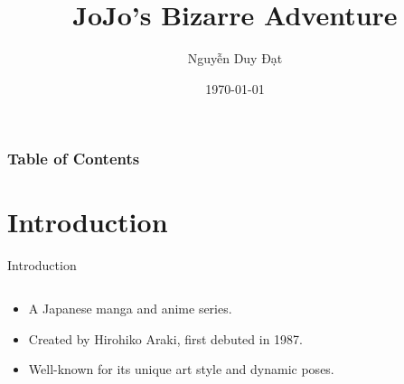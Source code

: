\documentclass[presentation]{beamer}
\title{JoJo's Bizarre Adventure}
\author{Nguyễn Duy Đạt}
\institute{HUST}
\date{\today}
\begin{document}
\begin{frame}
	\titlepage
\end{frame}

\begin{frame}
	\frametitle{Table of Contents}
	\tableofcontents
\end{frame}
\section{Introduction}
\begin{frame}{Introduction}
	\begin{columns}[T]
		
		
		\begin{column}{0.45\textwidth}
			\begin{itemize}
				\item<1-> A Japanese manga and anime series.
				\vspace{1.5em}
				\item<1->
				Created by Hirohiko Araki, first debuted in 1987.
				\vspace{1.5em}
				\item<2-> Well-known for its unique art style and dynamic poses.
			\end{itemize}
		\end{column}
		
		\begin{column}{0.55\textwidth}
			\centering
			      

\end{column}
\end{columns}
\end{frame}
\end{document}
